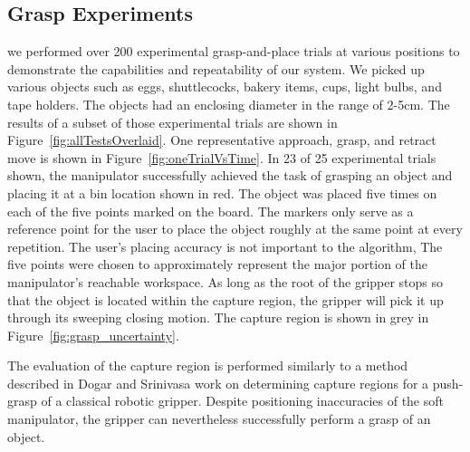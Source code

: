\subsection{Grasp Experiments}
we performed over 200 experimental grasp-and-place trials at various positions to demonstrate the capabilities and repeatability of our system.
We picked up various objects such as eggs, shuttlecocks, bakery items, cups, light bulbs, and tape holders. 
The objects had an enclosing diameter in the range of 2-5\unit{cm}. 
The results of a subset of those experimental trials are shown in Figure~\ref{fig:allTestsOverlaid}.
One representative approach, grasp, and retract move is shown in Figure~\ref{fig:oneTrialVsTime}.
In 23 of 25 experimental trials shown, the manipulator successfully achieved the task of grasping an object and placing it at a bin location shown in red.
The object was placed five times on each of the five points marked on the board.
The markers only serve as a reference point for the user to place the object roughly at the same point at every repetition.
The user's placing accuracy is not important to the algorithm, 
The five points were chosen to approximately represent the major portion of the manipulator's reachable workspace.
As long as the root of the gripper stops so that the object is located within the capture region, the gripper will pick it up through its sweeping closing motion. The capture region is shown in grey in Figure~\ref{fig:grasp_uncertainty}. 

The evaluation of the capture region is performed similarly to a method described in Dogar and Srinivasa\cite{dogar2010push} work on determining capture regions for a push-grasp of a classical robotic gripper.
Despite positioning inaccuracies of the soft manipulator, the gripper can nevertheless successfully perform a grasp of an object. 

